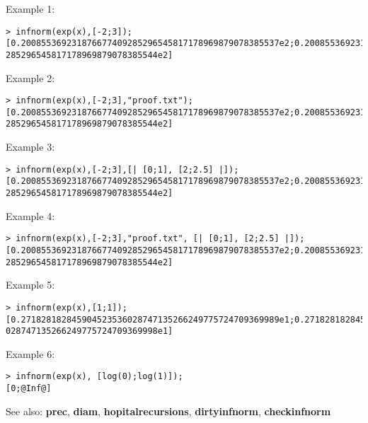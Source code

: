 \noindent Example 1: 
\begin{center}\begin{minipage}{15cm}\begin{Verbatim}[frame=single]
> infnorm(exp(x),[-2;3]);
[0.200855369231876677409285296545817178969879078385537e2;0.200855369231876677409
285296545817178969879078385544e2]
\end{Verbatim}
\end{minipage}\end{center}
\noindent Example 2: 
\begin{center}\begin{minipage}{15cm}\begin{Verbatim}[frame=single]
> infnorm(exp(x),[-2;3],"proof.txt");
[0.200855369231876677409285296545817178969879078385537e2;0.200855369231876677409
285296545817178969879078385544e2]
\end{Verbatim}
\end{minipage}\end{center}
\noindent Example 3: 
\begin{center}\begin{minipage}{15cm}\begin{Verbatim}[frame=single]
> infnorm(exp(x),[-2;3],[| [0;1], [2;2.5] |]);
[0.200855369231876677409285296545817178969879078385537e2;0.200855369231876677409
285296545817178969879078385544e2]
\end{Verbatim}
\end{minipage}\end{center}
\noindent Example 4: 
\begin{center}\begin{minipage}{15cm}\begin{Verbatim}[frame=single]
> infnorm(exp(x),[-2;3],"proof.txt", [| [0;1], [2;2.5] |]);
[0.200855369231876677409285296545817178969879078385537e2;0.200855369231876677409
285296545817178969879078385544e2]
\end{Verbatim}
\end{minipage}\end{center}
\noindent Example 5: 
\begin{center}\begin{minipage}{15cm}\begin{Verbatim}[frame=single]
> infnorm(exp(x),[1;1]);
[0.271828182845904523536028747135266249775724709369989e1;0.271828182845904523536
028747135266249775724709369998e1]
\end{Verbatim}
\end{minipage}\end{center}
\noindent Example 6: 
\begin{center}\begin{minipage}{15cm}\begin{Verbatim}[frame=single]
> infnorm(exp(x), [log(0);log(1)]);
[0;@Inf@]
\end{Verbatim}
\end{minipage}\end{center}
See also: \textbf{prec}, \textbf{diam}, \textbf{hopitalrecursions}, \textbf{dirtyinfnorm}, \textbf{checkinfnorm}
